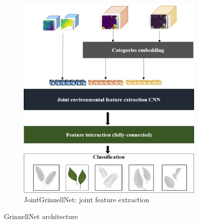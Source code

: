 \documentclass[]{article}
\begin{document}
\begin{figure}
\begin{subfigure}{0.5\textwidth}
		\includegraphics[scale=0.4]{grinnelljoint.png}
		\caption{JointGrinnellNet: joint feature extraction} \label{grinnellnet:b}
	\end{subfigure}
	\caption{GrinnellNet architecture} \label{grinnellnet}
\end{figure}
\end{document}
